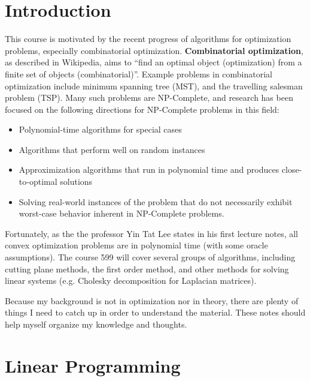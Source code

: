 \documentclass[12pt]{article}
\title{}
\begin{document}
\pagestyle{fancy}
\fancyhf{} %
\cfoot{\thepage}
\renewcommand{\headrulewidth}{1pt}

\section{Introduction}

This course is motivated by the recent progress of algorithms for optimization problems, especially combinatorial optimization. \textbf{Combinatorial optimization}, as described in Wikipedia, aims to ``find an optimal object (optimization) from a finite set of objects (combinatorial)''. Example problems in combinatorial optimization include minimum spanning tree (MST), and the travelling salesman problem (TSP). Many such problems are NP-Complete, and research has been focused on the following directions for NP-Complete problems in this field:
\begin{itemize}
\item Polynomial-time algorithms for special cases
\item Algorithms that perform well on random instances
\item Approximization algorithms that run in polynomial time and produces close-to-optimal solutions
\item Solving real-world instances of the problem that do not necessarily exhibit worst-case behavior inherent in NP-Complete problems.
\end{itemize}

Fortunately, as the the professor Yin Tat Lee states in his first lecture notes, all convex optimization problems are in polynomial time (with some oracle assumptions). The course 599 will cover several groups of algorithms, including cutting plane methods, the first order method, and other methods for solving linear systems (e.g. Cholesky decomposition for Laplacian matrices).

Because my background is not in optimization nor in theory, there are plenty of things I need to catch up in order to understand the material. These notes should help myself organize my knowledge and thoughts.

\section{Linear Programming}
\end{document}
